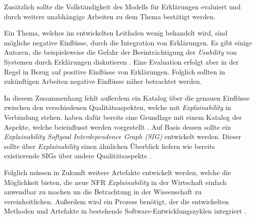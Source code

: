 Zusätzlich sollte die Vollständigkeit des Modells für Erklärungen evaluiert und durch weitere unabhängige Arbeiten zu dem Thema bestätigt werden.

Ein Thema, welches im entwickelten Leitfaden wenig behandelt wird, sind mögliche negative Einflüsse, durch die Integration von Erklärungen. Es gibt einige Autoren, die beispielsweise die Gefahr der Beeinträchtigung der \textit{Usability} von Systemen durch Erklärungen diskutieren \cite{chazette_knowledge_nodate,koo_understanding_2016,kohl_explainability_2019}. Eine Evaluation erfolgt aber in der Regel in Bezug auf positive Einflüsse von Erklärungen. 
Folglich sollten in zukünftigen Arbeiten negative Einflüsse näher  betrachtet werden.

In diesem Zusammenhang fehlt außerdem ein Katalog über die genauen Einflüsse zwischen den verschiedenen Qualitätsaspekten, welche mit \textit{Explainability} in Verbindung stehen. \citeauthor{chazette_knowledge_nodate} haben dafür bereits eine Grundlage mit einem Katalog der Aspekte, welche beieinflusst werden vorgestellt \cite{chazette_knowledge_nodate}. Auf Basis dessen sollte ein \textit{Explainability Softgoal Interdependence Graph (SIG)} entwickelt werden. Dieser sollte über \textit{Explainability} einen ähnlichen Überblick liefern wie bereits existierende SIGs über andere Qualitätsaspekte \cite[vgl.][]{do2010software, carvalho2020developers}.

Folglich müssen in Zukunft weitere Artefakte entwickelt werden, welche die Möglichkeit bieten, die neue NFR \textit{Explainability} in der Wirtschaft einfach anwendbar zu machen un die Betrachtung in der Wissenschaft zu vereinheitlichen\cite{sokol_explainability_2020}. Außerdem wird ein Prozess benötigt, der die entwickelten Methoden und Artefakte in bestehende Software-Entwicklungszyklen integriert \cite{kohl_explainability_2019, cassens_ambient_2019}.